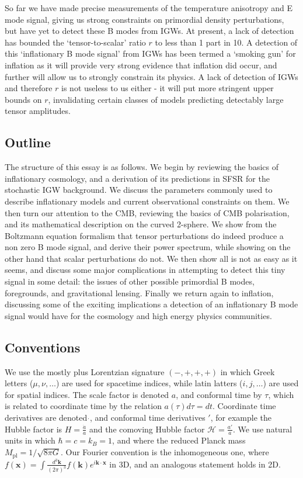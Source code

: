 \documentclass[a4paper,10pt]{article}
\renewcommand{\v}[1]{\mathbf{#1}}
\newcommand{\Mp}{M_{\text{pl}}}
\newcommand{\fint}[1]{\int \frac{d^3 \v{#1}}{(2\pi)^3}}
\begin{document}
So far we have made precise measurements of the temperature anisotropy and E mode signal, giving us strong constraints on primordial density perturbations, but have yet to detect these B modes from IGWs. At present, a lack of detection has bounded the `tensor-to-scalar' ratio $r$ to less than 1 part in 10. A detection of this `inflationary B mode signal' from IGWs has been termed a `smoking gun' for inflation as it will provide very strong evidence that inflation did occur, and further will allow us to strongly constrain its physics. A lack of detection of IGWs and therefore $r$ is not useless to us either - it will put more stringent upper bounds on $r$, invalidating certain classes of models predicting detectably large tensor amplitudes.\\

\subsection{Outline}

The structure of this essay is as follows. We begin by reviewing the basics of inflationary cosmology, and a derivation of its predictions in SFSR for the stochastic IGW background. We discuss the parameters commonly used to describe inflationary models and current observational constraints on them. We then turn our attention to the CMB, reviewing the basics of CMB polarisation, and its mathematical description on the curved 2-sphere. We show from the Boltzmann equation formalism that tensor perturbations do indeed produce a non zero B mode signal, and derive their power spectrum, while showing on the other hand that scalar perturbations do not. We then show all is not as easy as it seems, and discuss some major complications in attempting to detect this tiny signal in some detail: the issues of other possible primordial B modes, foregrounds, and gravitational lensing. Finally we return again to inflation, discussing some of the exciting implications a detection of an inflationary B mode signal would have for the cosmology and high energy physics communities. 

\subsection{Conventions}

We use the mostly plus Lorentzian signature $(-,+,+,+)$ in which Greek letters ($\mu,\nu,\ldots$) are used for spacetime indices, while latin latters ($i,j,\ldots$) are used for spatial indices. The scale factor is denoted $a$, and conformal time by $\tau$, which is related to coordinate time by the relation $a(\tau)d\tau = dt$. Coordinate time derivatives are denoted $\dot{}$, and conformal time derivatives $'$, for example the Hubble factor is $H=\frac{\dot{a}}{a}$ and the comoving Hubble factor $\mathcal{H}=\frac{a'}{a}$. We use natural units in which $\hbar=c=k_B=1$, and where the reduced Planck mass $\Mp = 1/\sqrt{8\pi G}$. Our Fourier convention is the inhomogeneous one, where $f(\v{x}) = \fint{k} f(\v{k})e^{i\v{k}\cdot\v{x}}$ in 3D, and an analogous statement holds in 2D.
\end{document}
